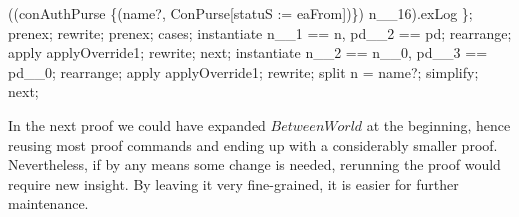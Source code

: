 \begin{LPScript}
\begin{zproof}[lPromotedAuxWorldAbortType]
                            \in ((conAuthPurse
                                \oplus \{(name?, \theta ConPurse[statuS := eaFrom])\})
                                n\_\_16).exLog \};
            prenex;
            rewrite;
            prenex;
            cases;
                instantiate n\_\_1 == n, pd\_\_2 == pd;
                rearrange;
                apply applyOverride1;
                rewrite;
            next;
                instantiate n\_\_2 == n\_\_0, pd\_\_3 == pd\_\_0;
                rearrange;
                apply applyOverride1;
                rewrite;
                split \lnot n = name?;
                simplify;
    next;
\end{zproof}\end{LPScript}

In the next proof we could have expanded $BetweenWorld$ at the beginning,
hence reusing most proof commands and ending up with a considerably smaller
proof. Nevertheless, if by any means some change is needed, rerunning the
proof would require new insight. By leaving it very fine-grained, it is easier
for further maintenance.

